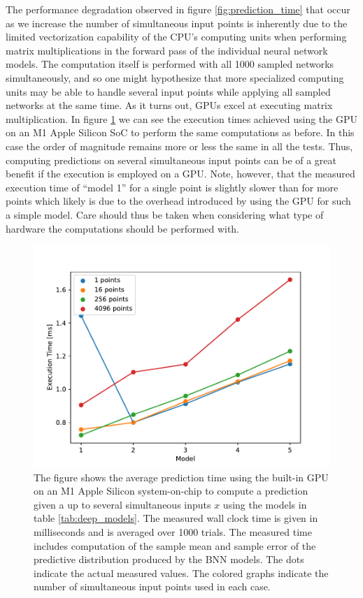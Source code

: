The performance degradation observed in figure \ref{fig:prediction_time} that occur as we increase the number of simultaneous input points is inherently due to the limited vectorization capability of the CPU's computing units when performing matrix multiplications in the forward pass of the individual neural network models. The computation itself is performed with all 1000 sampled networks simultaneously, and so one might hypothesize that more specialized computing units may be able to handle several input points while applying all sampled networks at the same time. As it turns out, GPUs excel at executing matrix multiplication. In figure \ref{fig:prediction_time_gpu} we can see the execution times achieved using the GPU on an M1 Apple Silicon SoC to perform the same computations as before. In this case the order of magnitude remains more or less the same in all the tests. Thus, computing predictions on several simultaneous input points can be of a great benefit if the execution is employed on a GPU. Note, however, that the measured execution time of ``model 1'' for a single point is slightly slower than for more points which likely is due to the overhead introduced by using the GPU for such a simple model. Care should thus be taken when considering what type of hardware the computations should be performed with.


\begin{figure}[H]
    \centering
    \includegraphics[scale=0.7]{figures/prediction_time/prediction_time_gpu.pdf}
    \caption{The figure shows the average prediction time using the built-in GPU on an M1 Apple Silicon system-on-chip to compute a prediction given a up to several simultaneous inputs $x$ using the models in table \ref{tab:deep_models}. The measured wall clock time is given in milliseconds and is averaged over 1000 trials. The measured time includes computation of the sample mean and sample error of the predictive distribution produced by the BNN models. The dots indicate the actual measured values. The colored graphs indicate the number of simultaneous input points used in each case.
    }
    \label{fig:prediction_time_gpu}
\end{figure}

